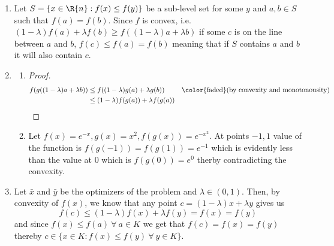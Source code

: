 \documentclass{article}
\begin{document}
\begin{tasks}
\begin{enumerate}[label={\color{tcum}P \arabic{week}.\arabic*}]
            \item \label{proof:cnvx} Let \(S = \{x \in \R{n}: f(x) \le f(y)\}\) be a sub-level set for some \(y\) and \(a, b \in S\) such that \(f(a) = f(b)\). Since \(f\) is convex, i.e. 
                \((1-\lambda)f(a) + \lambda f(b) \ge f((1-\lambda)a + \lambda b)\) if some \(c\) is on the line between \(a\) and \(b\), \(f(c) \le f(a) = f(b)\) meaning that if \(S\) contains \(a\) and \(b\) it will also contain \(c\). 
            \item \begin{enumerate}
                    \item \begin{proof}
                            \begin{displaymath}
                                \begin{aligned}
                                    f(g((1-\lambda)a+\lambda b)) &\le
                                    f((1-\lambda)g(a) + \lambda g(b)) & \text{\color{faded}(by convexity and monotonousity)} \\
                                    &\le (1-\lambda)f(g(a)) + \lambda f(g(a))
                                \end{aligned}
                            \end{displaymath}
                        \end{proof}
                    \item Let \(f(x) = e^{-x}, g(x) = x^2, f(g(x)) = e^{-x^2}\). At points \(-1, 1\) value of the function is \(f(g(-1)) = f(g(1)) = e^{-1}\) which is evidently less than the value at \(0\) which is \(f(g(0)) = e^0\) therby contradicting the convexity.
                \end{enumerate}
            \item Let \(\bar{x}\) and \(\bar{y}\) be the optimizers of the problem and \(\lambda \in (0, 1)\). Then, by convexity of \(f(x)\), we know that any point \(c = (1-\lambda)x+\lambda y\) gives us 
            \begin{displaymath}
                f(c) \le (1-\lambda)f(x)+\lambda f(y) = f(x) = f(y)
            \end{displaymath}
            and since \(f(x) \le f(a)\ \forall\ a \in K\) we get that \(f(c) = f(x) = f(y)\) thereby \(c \in \{x\in K : f(x) \le f(y)\ \forall\ y\in K\}\).
        \end{enumerate}
        \vspace*{16pt}

\end{tasks}
\end{document}
